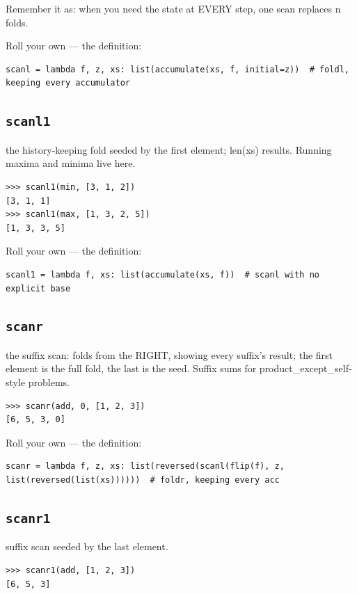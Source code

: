 \documentclass[10pt,letterpaper]{book}
\begin{document}
Remember it as: when you need the state at EVERY step, one scan replaces n folds.


Roll your own --- the definition:

\begin{lstlisting}[style=ex]
scanl = lambda f, z, xs: list(accumulate(xs, f, initial=z))  # foldl, keeping every accumulator
\end{lstlisting}

\subsection{\texttt{scanl1}}\label{def:scanl1}
the history-keeping fold seeded by the first element; len(xs) results. Running maxima and minima live here.
\begin{lstlisting}[style=ex]
>>> scanl1(min, [3, 1, 2])
[3, 1, 1]
>>> scanl1(max, [1, 3, 2, 5])
[1, 3, 3, 5]
\end{lstlisting}

Roll your own --- the definition:

\begin{lstlisting}[style=ex]
scanl1 = lambda f, xs: list(accumulate(xs, f))  # scanl with no explicit base
\end{lstlisting}
\subsection{\texttt{scanr}}\label{def:scanr}
the suffix scan: folds from the RIGHT, showing every suffix's result; the first element is the full fold, the last is the seed. Suffix sums for product\_except\_self-style problems.
\begin{lstlisting}[style=ex]
>>> scanr(add, 0, [1, 2, 3])
[6, 5, 3, 0]
\end{lstlisting}

Roll your own --- the definition:

\begin{lstlisting}[style=ex]
scanr = lambda f, z, xs: list(reversed(scanl(flip(f), z, list(reversed(list(xs))))))  # foldr, keeping every acc
\end{lstlisting}

\subsection{\texttt{scanr1}}\label{def:scanr1}
suffix scan seeded by the last element.
\begin{lstlisting}[style=ex]
>>> scanr1(add, [1, 2, 3])
[6, 5, 3]
\end{lstlisting}
\end{document}
